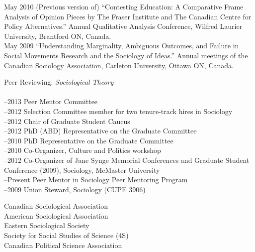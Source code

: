 \documentclass[11pt,usenames,dvipsnames]{article}
\begin{document}
\ind May 2010 (Previous version of) ``Contesting Education: A Comparative Frame Analysis of Opinion Pieces by The Fraser Institute and The Canadian Centre for Policy Alternatives.'' Annual Qualitative Analysis Conference, Wilfred Laurier University, Brantford ON, Canada.\\

\ind May 2009 ``Understanding Marginality, Ambiguous Outcomes, and Failure in Social Movements Research and the Sociology of Ideas.'' Annual meetings of the Canadian Sociology Association, Carleton University, Ottawa ON, Canada.\\



\noindent Peer Reviewing: {\it Sociological Theory}\\

\\
–2013 Peer Mentor Committee\\
–2012 Selection Committee member for two tenure-track hires in Sociology\\
–2012 Chair of Graduate Student Caucus\\
–2012 PhD (ABD) Representative on the Graduate Committee\\
–2010 PhD Representative on the Graduate Committee\\
–2010 Co-Organizer, Culture and Politics workshop\\
–2012 Co-Organizer of Jane Synge Memorial Conferences and Graduate Student Conference (2009), Sociology, McMaster University\\
–Present Peer Mentor in Sociology Peer Mentoring Program\\
–2009 Union Steward, Sociology (CUPE 3906)\\



\noindent Canadian Sociological Association\\
\noindent American Sociological Association \\
\noindent Eastern Sociological Society\\
\noindent Society for Social Studies of Science (4S)\\
\noindent Canadian Political Science Association \\
\end{document}
